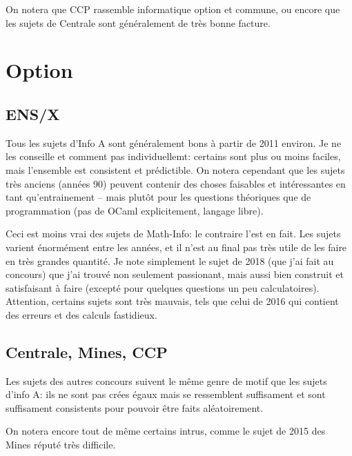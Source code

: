 \documentclass{article}
\begin{document}
On notera que CCP rassemble informatique option et commune, ou encore que les sujets de Centrale sont généralement de très bonne facture.

\section{Option}
\subsection{ENS/X}
Tous les sujets d'Info A sont généralement bons à partir de 2011 environ.
Je ne les conseille et comment pas individuellemt: certains sont plus ou moins faciles, mais l'ensemble est consistent et prédictible.
On notera cependant que les sujets très anciens (années 90) peuvent contenir des choses faisables et intéressantes en tant qu'entrainement -- mais plutôt pour les questions théoriques que de programmation (pas de OCaml explicitement, langage libre).

Ceci est moins vrai des sujets de Math-Info: le contraire l'est en fait.
Les sujets varient énormément entre les années, et il n'est au final pas très utile de les faire en très grandes quantité.
Je note simplement le sujet de 2018 (que j'ai fait au concours) que j'ai trouvé non seulement passionant, mais aussi bien construit et satisfaisant à faire (excepté pour quelques questions un peu calculatoires).
Attention, certains sujets sont très mauvais, tels que celui de 2016 qui contient des erreurs et des calculs fastidieux.

\subsection{Centrale, Mines, CCP}
Les sujets des autres concours suivent le même genre de motif que les sujets d'info A: ils ne sont pas crées égaux mais se ressemblent suffisament et sont suffisament consistents pour pouvoir être faits aléatoirement.

On notera encore tout de même certains intrus, comme le sujet de 2015 des Mines réputé très difficile.
\end{document}
